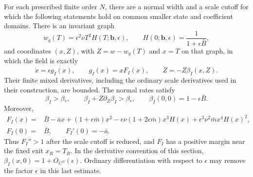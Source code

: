 \begin{proposition}\label{rw:phase}
For each prescribed finite order $N$, there are a normal width and a
scale cutoff for which the following statements hold on common smaller
state and coefficient domains. There is an invariant graph
\begin{equation}\label{rw:transitions:weak-graph}
 w_g(T)=\epsilon^2\nu T^2H(T;\mathbf b,\epsilon),
 \qquad H(0;\mathbf b,\epsilon)=\frac1{1+\epsilon\bar B},
\end{equation}
and coordinates $(x,Z)$, with $Z=w-w_g(T)$ and $x=T$ on that graph,
in which the field is exactly
\begin{equation}\label{rw:transitions:lower-triangular}
 \dot x=\epsilon g_I(x),\qquad
 g_I(x)=xF_I(x),\qquad \dot Z=-Z\beta_I(x,Z).
\end{equation}
Their finite mixed derivatives, including the ordinary scale derivatives
used in their construction, are bounded. The normal rates satisfy
\[
 \beta_I>\beta_*,\qquad
 \beta_I+Z\partial_Z\beta_I>\beta_*,\qquad
 \beta_I(0,0)=1-\epsilon\bar B.
\]
Moreover,
\begin{equation}\label{rw:transitions:lower-factor}
\begin{aligned}
 F_I(x)={}&\bar B-\bar ax+(1+\epsilon\bar m)x^2
 -\epsilon\nu(1+2\epsilon\bar m)x^3H(x)
 +\epsilon^3\nu^2\bar m x^4H(x)^2,\\
 F_I(0)={}&\bar B,\qquad F_I'(0)=-\bar a.
\end{aligned}
\end{equation}
Thus $F_I''>1$ after the scale cutoff is reduced, and $F_I$ has a
positive margin near the fixed exit $x_R=T_R$.
In the derivative convention of this section,
$\beta_I(x,0)=1+O_{C^N}(\epsilon)$.
Ordinary differentiation with respect to $\epsilon$ may remove the
factor $\epsilon$ in this last estimate.
\end{proposition}

